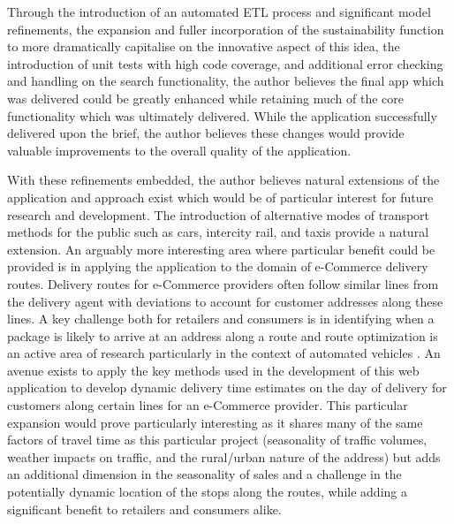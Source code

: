 \documentclass[]{UCD_CS_47360_Report}
\begin{document}
Through the introduction of an automated ETL process and significant model refinements, the expansion and fuller incorporation of the sustainability function to more dramatically capitalise on the innovative aspect of this idea, the introduction of unit tests with high code coverage, and additional error checking and handling on the search functionality, the author believes the final app which was delivered could be greatly enhanced while retaining much of the core functionality which was ultimately delivered. While the application successfully delivered upon the brief, the author believes these changes would provide valuable improvements to the overall quality of the application.

With these refinements embedded, the author believes natural extensions of the application and approach exist which would be of particular interest for future research and development. The introduction of alternative modes of transport methods for the public such as cars, intercity rail, and taxis provide a natural extension. An arguably more interesting area where particular benefit could be provided is in applying the application to the domain of e-Commerce delivery routes. Delivery routes for e-Commerce providers often follow similar lines from the delivery agent with deviations to account for customer addresses along these lines. A key challenge both for retailers and consumers is in identifying when a package is likely to arrive at an address along a route and route optimization is an active area of research particularly in the context of automated vehicles \cite{delivery}. An avenue exists to apply the key methods used in the development of this web application to develop dynamic delivery time estimates on the day of delivery for customers along certain lines for an e-Commerce provider. This particular expansion would prove particularly interesting as it shares many of the same factors of travel time as this particular project (seasonality of traffic volumes, weather impacts on traffic, and the rural/urban nature of the address) but adds an additional dimension in the seasonality of sales and a challenge in the potentially dynamic location of the stops along the routes, while adding a significant benefit to retailers and consumers alike.
\end{document}
